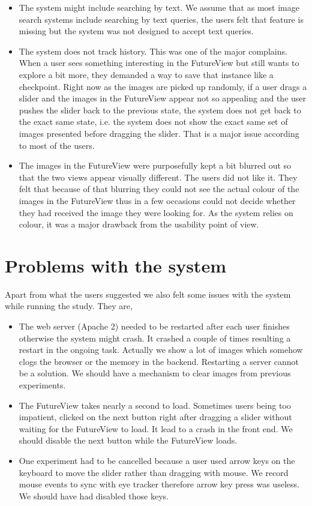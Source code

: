 \documentclass[english]{tktltiki}
\begin{document}
\begin{itemize}
	\item The system might include searching by text. We assume that as most image search systems include searching by text queries, the users felt that feature is missing but the system was not designed to accept text queries.
	\item The system does not track history. This was one of the major complains. When a user sees something interesting in the FutureView but still wants to explore a bit more, they demanded a way to save that instance like a checkpoint. Right now as the images are picked up randomly, if a user drags a slider and the images in the FutureView appear not so appealing and the user pushes the slider back to the previous state, the system does not get back to the exact same state, i.e. the system does not show the exact same set of images presented before dragging the slider. That is a major issue according to most of the users.
	\item The images in the FutureView were purposefully kept a bit blurred out so that the two views appear visually different. The users did not like it. They felt that because of that blurring they could not see the actual colour of the images in the FutureView thus in a few occasions could not decide whether they had received the image they were looking for. As the system relies on colour, it was a major drawback from the usability point of view.
\end{itemize}

\section{Problems with the system}

Apart from what the users suggested we also felt some issues with the system while running the study. They are,

\begin{itemize}
	\item The web server (Apache 2) needed to be restarted after each user finishes otherwise the system might crash. It crashed a couple of times resulting a restart in the ongoing task. Actually we show a lot of images which somehow clogs the browser or the memory in the backend. Restarting a server cannot be a solution. We should have a mechanism to clear images from previous experiments.
	\item The FutureView takes nearly a second to load. Sometimes users being too impatient, clicked on the next button right after dragging a slider without waiting for the FutureView to load. It lead to a crash in the front end. We should disable the next button while the FutureView loads.
	\item One experiment had to be cancelled because a user used arrow keys on the keyboard to move the slider rather than dragging with mouse. We record mouse events to sync with eye tracker therefore arrow key press was useless. We should have had disabled those keys. 
\end{itemize}
\end{document}
